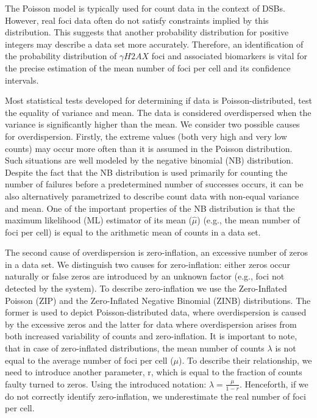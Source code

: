 The Poisson model is typically used for count data in the context of DSBs. However, 
real foci data often do not satisfy constraints implied by this distribution. 
This suggests that another probability distribution for positive integers may 
describe a data set more accurately. Therefore, an identification of the probability 
distribution of $\gamma H2AX$ foci and associated biomarkers is vital for the 
precise estimation of the mean number of foci per cell and its confidence 
intervals.

Most statistical tests developed for determining if data is 
Poisson-distributed, test the equality of variance and mean. The data is 
considered overdispersed when the variance is significantly higher than the 
mean. We consider two possible causes for overdispersion. Firstly, the extreme 
values (both very high and very low counts) may occur more often than it is 
assumed in the Poisson distribution. Such situations are well modeled by the 
negative binomial (NB) distribution. Despite the fact that the NB distribution 
is used primarily for counting the number of failures before a predetermined 
number of successes occurs, it can be also alternatively parametrized to 
describe count data with non-equal variance and mean. One of the important 
properties of the NB distribution is that the maximum likelihood (ML) estimator 
of its mean ($\hat{\mu}$) (e.g., the mean number of foci per cell) is equal to 
the arithmetic mean of counts in a data set.

The second cause of overdispersion is zero-inflation, an excessive number of 
zeros in a data set. We distinguish two causes for zero-inflation: either zeros 
occur naturally or false zeros are introduced by an unknown factor (e.g., foci 
not detected by the system). To describe zero-inflation we use the Zero-Inflated 
Poisson (ZIP) and the Zero-Inflated Negative Binomial (ZINB) distributions. The 
former is used to depict Poisson-distributed data, where overdispersion is 
caused by the excessive zeros and the latter for data where overdispersion 
arises from both increased variability of counts and zero-inflation. It is 
important to note, that in case of zero-inflated distributions, the mean number 
of counts $\lambda$ is not equal to the average number of foci per cell ($\mu$). 
To describe their relationship, we need to introduce another parameter, r, which 
is equal to the fraction of counts faulty turned to zeros. Using the introduced 
notation: $\lambda = \frac{\mu}{1 - r}$. Henceforth, if we do not correctly 
identify zero-inflation, we underestimate the real number of foci per cell.

